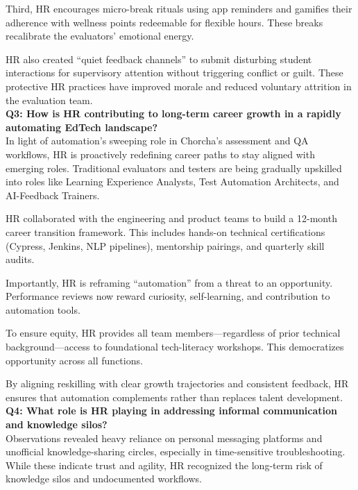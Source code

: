 \documentclass[12pt,a4paper,oneside]{book}
\begin{document}
Third, HR encourages micro-break rituals using app reminders and gamifies their adherence with wellness points redeemable for flexible hours. These breaks recalibrate the evaluators’ emotional energy.

HR also created “quiet feedback channels” to submit disturbing student interactions for supervisory attention without triggering conflict or guilt. These protective HR practices have improved morale and reduced voluntary attrition in the evaluation team.\\

\textbf{Q3: How is HR contributing to long-term career growth in a rapidly automating EdTech landscape?} \\

In light of automation's sweeping role in Chorcha’s assessment and QA workflows, HR is proactively redefining career paths to stay aligned with emerging roles. Traditional evaluators and testers are being gradually upskilled into roles like Learning Experience Analysts, Test Automation Architects, and AI-Feedback Trainers.

HR collaborated with the engineering and product teams to build a 12-month career transition framework. This includes hands-on technical certifications (Cypress, Jenkins, NLP pipelines), mentorship pairings, and quarterly skill audits.

Importantly, HR is reframing “automation” from a threat to an opportunity. Performance reviews now reward curiosity, self-learning, and contribution to automation tools.

To ensure equity, HR provides all team members—regardless of prior technical background—access to foundational tech-literacy workshops. This democratizes opportunity across all functions.

By aligning reskilling with clear growth trajectories and consistent feedback, HR ensures that automation complements rather than replaces talent development.\\



\textbf{Q4: What role is HR playing in addressing informal communication and knowledge silos?} \\

Observations revealed heavy reliance on personal messaging platforms and unofficial knowledge-sharing circles, especially in time-sensitive troubleshooting. While these indicate trust and agility, HR recognized the long-term risk of knowledge silos and undocumented workflows.
\end{document}
